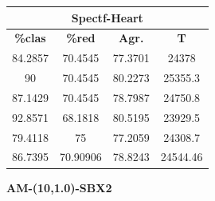 \documentclass[11pt,a4paper]{article}
\theoremstyle{definition}
\begin{document}
\begin{tabbing}
{		\begin{tabular}{|c|c|c|c|}
			\hline
			\multicolumn{4}{|c|}{\textbf{Spectf-Heart}} \\ \hline
			\textbf{\%clas} & \textbf{\%red} & \textbf{Agr.} & \textbf{T} \\ \hline 
			84.2857 & 70.4545 & 77.3701 & 24378 \\ \hline
90 & 70.4545 & 80.2273 & 25355.3 \\ \hline
87.1429 & 70.4545 & 78.7987 & 24750.8 \\ \hline
92.8571 & 68.1818 & 80.5195 & 23929.5 \\ \hline
79.4118 & 75 & 77.2059 & 24308.7 \\ \hline
86.7395 & 70.90906 & 78.8243 & 24544.46 \\ \hline
		\end{tabular}
		}
	\end{tabbing}
	
	\textbf{AM-(10,1.0)-SBX2}	
	
\end{document}
